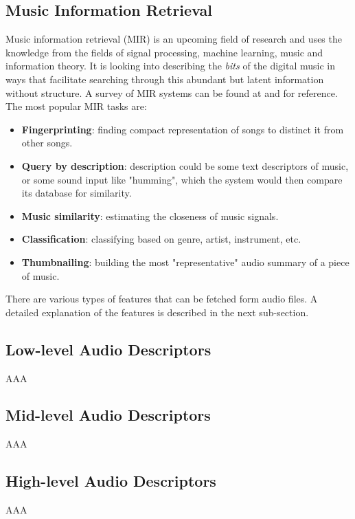 \documentclass[letterpaper, 10 pt, conference]{ieeeconf}
\begin{document}
\subsection{Music Information Retrieval}
Music information retrieval (MIR) is an upcoming field of research and uses the knowledge from the fields of signal processing, machine learning, music and information theory. It is looking into describing the {\it bits} of the digital music in ways that facilitate searching through this abundant but latent information without structure. A survey of MIR systems can be found at \cite{c6} and \cite{c7} for reference. The most popular MIR tasks are:
\begin{itemize}
\item {\bf Fingerprinting}: finding compact representation of songs to distinct it from other songs.
\item {\bf Query by description}: description could be some text descriptors of music, or some sound input like "humming", which the system would then compare its database for similarity.
\item {\bf Music similarity}: estimating the closeness of music signals.
\item {\bf Classification}: classifying based on genre, artist, instrument, etc. 
\item {\bf Thumbnailing}: building the most "representative" audio summary of a piece of music.
\end{itemize}
There are various types of features that can be fetched form audio files. A detailed explanation of the features is described in the next sub-section.
\subsection{Low-level Audio Descriptors}
AAA
\subsection{Mid-level Audio Descriptors}
AAA
\subsection{High-level Audio Descriptors}
AAA
\end{document}
